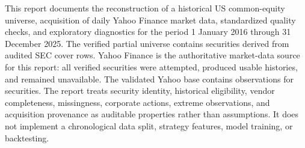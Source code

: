 
This report documents the reconstruction of a historical US common-equity
universe, acquisition of daily Yahoo Finance market data, standardized quality
checks, and exploratory diagnostics for the period 1 January 2016 through
31 December 2025. The verified partial universe contains \IncludedSecurities{}
securities derived from \AuditRows{} audited SEC cover rows. Yahoo Finance is
the authoritative market-data source for this report: all \YahooAttempted{}
verified securities were attempted, \YahooSuccess{} produced usable histories,
and \YahooFailed{} remained unavailable. The validated Yahoo base contains
\Observations{} observations for \ObservedSecurities{} securities. The report
treats security identity, historical eligibility, vendor completeness,
missingness, corporate actions, extreme observations, and acquisition
provenance as auditable properties rather than assumptions. It does not
implement a chronological data split, strategy features, model training, or
backtesting.

